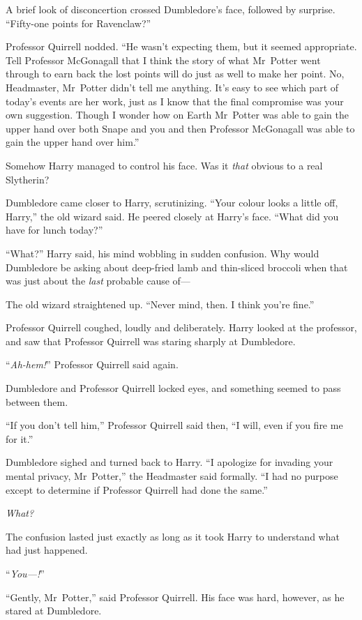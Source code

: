 A brief look of disconcertion crossed Dumbledore’s face, followed by surprise.
“Fifty-one points for Ravenclaw?”

Professor Quirrell nodded.
“He wasn’t expecting them, but it seemed appropriate. Tell Professor McGonagall that I think the story of what Mr~Potter went through to earn back the lost points will do just as well to make her point. No, Headmaster, Mr~Potter didn’t tell me anything. It’s easy to see which part of today’s events are her work, just as I know that the final compromise was your own suggestion. Though I wonder how on Earth Mr~Potter was able to gain the upper hand over both Snape and you and then Professor McGonagall was able to gain the upper hand over him.”

Somehow Harry managed to control his face. Was it \emph{that} obvious to a real Slytherin?

Dumbledore came closer to Harry, scrutinizing.
“Your colour looks a little off, Harry,” the old wizard said. He peered closely at Harry’s face.
“What did you have for lunch today?”

“What?” Harry said, his mind wobbling in sudden confusion. Why would Dumbledore be asking about deep-fried lamb and thin-sliced broccoli when that was just about the \emph{last} probable cause of—

The old wizard straightened up.
“Never mind, then. I think you’re fine.”

Professor Quirrell coughed, loudly and deliberately. Harry looked at the professor, and saw that Professor Quirrell was staring sharply at Dumbledore.

“\emph{Ah-hem!}” Professor Quirrell said again.

Dumbledore and Professor Quirrell locked eyes, and something seemed to pass between them.

“If you don’t tell him,” Professor Quirrell said then,
“I will, even if you fire me for it.”

Dumbledore sighed and turned back to Harry.
“I apologize for invading your mental privacy, Mr~Potter,” the Headmaster said formally.
“I had no purpose except to determine if Professor Quirrell had done the same.”

\emph{What?}

The confusion lasted just exactly as long as it took Harry to understand what had just happened.

“\emph{You—!}”

“Gently, Mr~Potter,” said Professor Quirrell. His face was hard, however, as he stared at Dumbledore.

